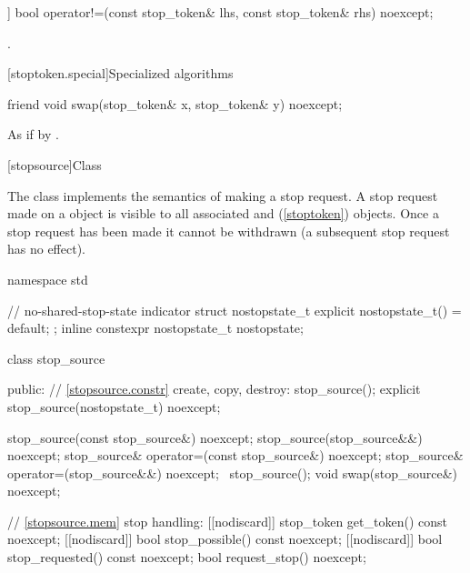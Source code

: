 {%
\begin{itemdecl}
[[nodiscard]] bool operator!=(const stop_token& lhs, const stop_token& rhs) noexcept;
\end{itemdecl}
\begin{itemdescr}
  \pnum\returns {}.
\end{itemdescr}


[stoptoken.special]{Specialized algorithms}

%
\begin{itemdecl}
friend void swap(stop_token& x, stop_token& y) noexcept;
\end{itemdecl}

\begin{itemdescr}
\pnum\effects As if by .
\end{itemdescr}



%
[stopsource]{Class }

\pnum
{}%
The class  implements the semantics of making a stop request.
A stop request made on a  object is visible to all
associated  and  (\ref{stoptoken}) objects.
Once a stop request has been made it cannot be withdrawn
(a subsequent stop request has no effect).

%
%

\begin{codeblock}
namespace std {
  // no-shared-stop-state indicator
  struct nostopstate_t {
    explicit nostopstate_t() = default;
  };
  inline constexpr nostopstate_t nostopstate{};

  class stop_source {
  public:
    // \ref{stopsource.constr} create, copy, destroy:
    stop_source();
    explicit stop_source(nostopstate_t) noexcept;

    stop_source(const stop_source&) noexcept;
    stop_source(stop_source&&) noexcept;
    stop_source& operator=(const stop_source&) noexcept;
    stop_source& operator=(stop_source&&) noexcept;
    ~stop_source();
    void swap(stop_source&) noexcept;

    // \ref{stopsource.mem} stop handling:
    [[nodiscard]] stop_token get_token() const noexcept;
    [[nodiscard]] bool stop_possible() const noexcept;
    [[nodiscard]] bool stop_requested() const noexcept;
    bool request_stop() noexcept;

}}
\end{codeblock}}
